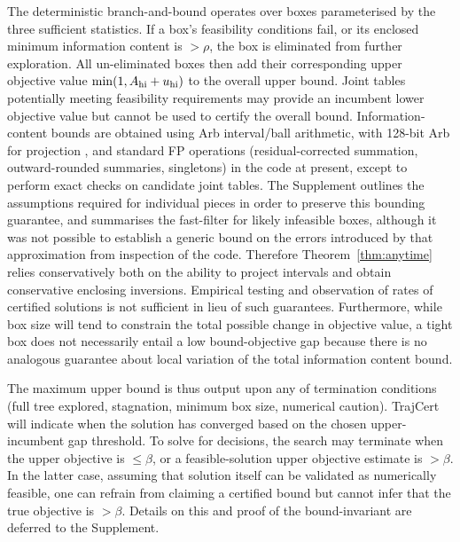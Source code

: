 The deterministic branch-and-bound operates over boxes parameterised by the three sufficient statistics. If a box's feasibility conditions fail, or its enclosed minimum information content is $>\rho$, the box is eliminated from further exploration. All un-eliminated boxes then add their corresponding upper objective value $\min(1,A_{\rm hi}+u_{\rm hi})$ to the overall upper bound. Joint tables potentially meeting feasibility requirements may provide an incumbent lower objective value but cannot be used to certify the overall bound. Information-content bounds are obtained using Arb interval/ball arithmetic, with 128-bit Arb for projection \citep{johansson2017}, and standard FP operations (residual-corrected summation, outward-rounded summaries, singletons) in the code at present, except to perform exact checks on candidate joint tables. The Supplement outlines the assumptions required for individual pieces in order to preserve this bounding guarantee, and summarises the fast-filter for likely infeasible boxes, although it was not possible to establish a generic bound on the errors introduced by that approximation from inspection of the code. Therefore Theorem~\ref{thm:anytime} relies conservatively both on the ability to project intervals and obtain conservative enclosing inversions. Empirical testing and observation of rates of certified solutions is not sufficient in lieu of such guarantees. Furthermore, while box size will tend to constrain the total possible change in objective value, a tight box does not necessarily entail a low bound-objective gap because there is no analogous guarantee about local variation of the total information content bound.

The maximum upper bound is thus output upon any of termination conditions (full tree explored, stagnation, minimum box size, numerical caution). TrajCert will indicate when the solution has converged based on the chosen upper-incumbent gap threshold. To solve for decisions, the search may terminate when the upper objective is $\leq \beta$, or a feasible-solution upper objective estimate is $>\beta$. In the latter case, assuming that solution itself can be validated as numerically feasible, one can refrain from claiming a certified bound but cannot infer that the true objective is $>\beta$. Details on this and proof of the bound-invariant are deferred to the Supplement.

